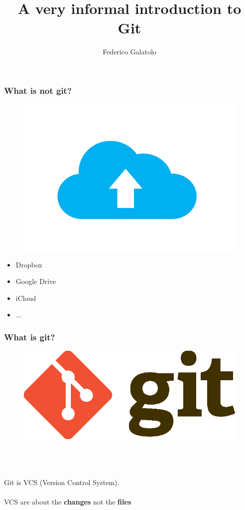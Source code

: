 \documentclass{beamer}
\title{A very informal introduction to Git}
\author{Federico Galatolo}
\date{}
\begin{document}
\frame{\titlepage}

\begin{frame}
    \frametitle{What is not git?}
    \begin{figure}
        \includegraphics[scale=0.1]{imgs/cloud.png}
    \end{figure}
    \begin{itemize}
        \item Dropbox
        \item Google Drive
        \item iCloud
        \item ...
    \end{itemize}
\end{frame}

\begin{frame}
    \frametitle{What is git?}
    \begin{figure}
        \includegraphics[scale=0.5]{imgs/git-logo.eps}
    \end{figure}
    \hfill \\\hfill \\\hfill \\
	Git is VCS (Version Control System). \\
	\hfill \\
	VCS are about the \textbf{changes} not the \textbf{files}\\
\end{frame}
\end{document}
